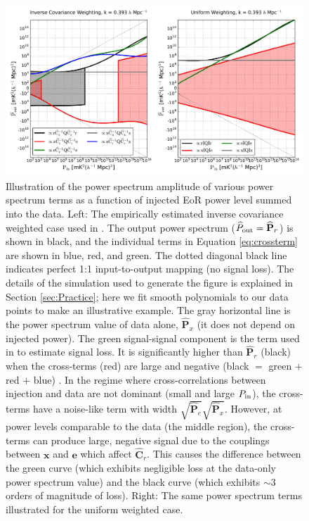 \documentclass[preprint2,numberedappendix,tighten]{aastex6}
\begin{document}
\begin{figure}
	\centering
	\includegraphics[width=1\textwidth]{plots/sigloss_terms.pdf}
	\caption{Illustration of the power spectrum amplitude of various power spectrum terms as a function of injected EoR power level summed into the 
data. Left: The empirically estimated inverse covariance weighted case used in . The output power spectrum ($\widehat{P}_{\rm out}=\widehat{\textbf{P}}_r$) is shown in black, and the individual terms in Equation 
\eqref{eq:crossterm} are shown in blue, red, and green. The dotted diagonal black line indicates perfect 1:1 input-to-output mapping (no signal loss). The details of the simulation used to generate the figure is explained in Section 
\ref{sec:Practice}; here we fit smooth polynomials to our data points to make an illustrative example.  The gray 
horizontal line is the power spectrum value of data alone, $\widehat{\textbf{P}}_{x}$ (it does not depend on injected power). The green signal-signal 
component is the term used in  to estimate signal loss. It is significantly higher 
than $\widehat{\textbf{P}}_{r}$ (black) when the cross-terms (red) are large and negative (black $=$ green $+$ red $+$ blue) . In the 
regime where cross-correlations between injection and data are not dominant (small and large $P_{\rm in}$), the cross-terms have a noise-like 
term with width $\sqrt{\widehat{\textbf{P}}_e}\sqrt{\widehat{\textbf{P}}_x}$. However, at power levels comparable to the data (the middle region), the cross-terms can produce large, negative signal due to the couplings between $\textbf{x}$ and $\textbf{e}$ which affect 
$\widehat{\textbf{C}}_{r}$. This causes the difference between the green curve (which exhibits negligible loss at 
the data-only power spectrum value) and the black curve (which exhibits $\sim$$3$ orders of magnitude of loss). Right: The same power spectrum terms illustrated for the uniform weighted case.}
	\label{fig:sigloss_terms}
\end{figure}
\end{document}
